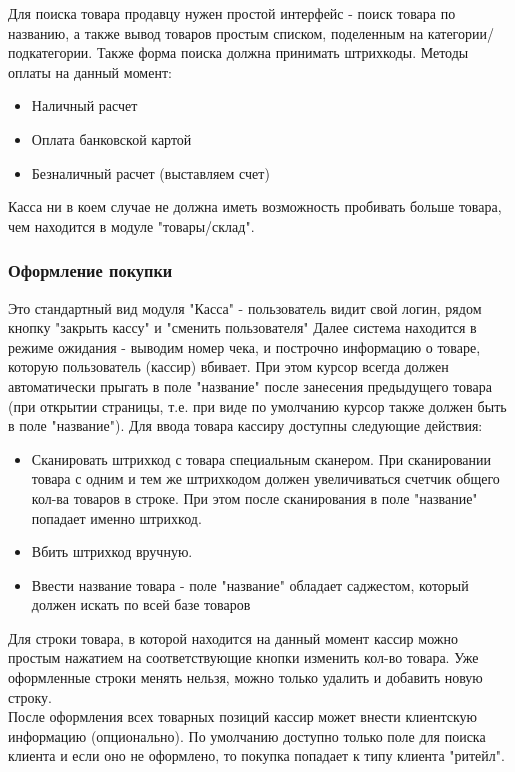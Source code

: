 \documentclass[DIV=calc, paper=a4, fontsize=11pt]{scrartcl} %
\begin{document}
Для поиска товара продавцу нужен простой интерфейс - поиск товара по названию, а также вывод товаров простым списком, поделенным на категории/подкатегории. Также форма поиска должна принимать штрихкоды. Методы оплаты на данный момент:
\begin{itemize}
	\item Наличный расчет
	\item Оплата банковской картой
	\item Безналичный расчет (выставляем счет)
\end{itemize}

Касса ни в коем случае не должна иметь возможность пробивать больше товара, чем находится в модуле "товары/склад".

\subsubsection{Оформление покупки}
Это стандартный вид модуля "Касса" - пользователь видит свой логин, рядом кнопку "закрыть кассу" и "сменить пользователя" 
Далее система находится в режиме ожидания - выводим номер чека, и построчно информацию о товаре, которую пользователь (кассир) вбивает. При этом курсор всегда должен автоматически прыгать в поле "название" после занесения предыдущего товара (при открытии страницы, т.е. при виде по умолчанию курсор также должен быть в поле "название"). Для ввода товара кассиру доступны следующие действия:

\begin{itemize}
	\item Сканировать штрихкод с товара специальным сканером. При сканировании товара с одним и тем же штрихкодом должен увеличиваться счетчик общего кол-ва товаров в строке. При этом после сканирования в поле "название" попадает именно штрихкод.
	\item Вбить штрихкод вручную.
	\item Ввести название товара - поле "название" обладает саджестом, который должен искать по всей базе товаров 
\end{itemize}

Для строки товара, в которой находится на данный момент кассир можно простым нажатием на соответствующие кнопки изменить кол-во товара. Уже оформленные строки менять нельзя, можно только удалить и добавить новую строку.
\\[0.5cm]
После оформления всех товарных позиций кассир может внести клиентскую информацию (опционально). По умолчанию доступно только поле для поиска клиента и если оно не оформлено, то покупка попадает к типу клиента "ритейл". 
\end{document}
